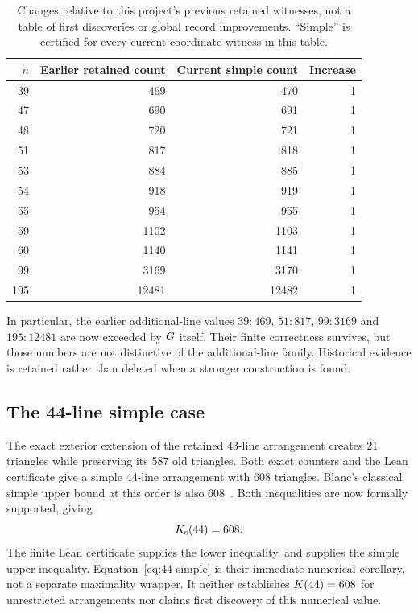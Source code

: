 \begin{table}[tbp]
\centering
\begin{tabular}{@{}rrrr@{}}
\toprule
$n$ & Earlier retained count & Current simple count & Increase\\
\midrule
39&469&470&1\\
47&690&691&1\\
48&720&721&1\\
51&817&818&1\\
53&884&885&1\\
54&918&919&1\\
55&954&955&1\\
59&1102&1103&1\\
60&1140&1141&1\\
99&3169&3170&1\\
195&12481&12482&1\\
\bottomrule
\end{tabular}
\caption{Changes relative to this project's previous retained witnesses, not a table of first discoveries or global record improvements. ``Simple'' is certified for every current coordinate witness in this table.}\label{tab:finite-refinement}
\end{table}

In particular, the earlier additional-line values $39:469$, $51:817$, $99:3169$ and $195:12481$ are now exceeded by $G$ itself. Their finite correctness survives, but those numbers are not distinctive of the additional-line family. Historical evidence is retained rather than deleted when a stronger construction is found.

\subsection{The 44-line simple case}

The exact exterior extension of the retained 43-line arrangement creates 21 triangles while preserving its 587 old triangles. Both exact counters and the Lean certificate give a simple 44-line arrangement with 608 triangles. Blanc's classical simple upper bound at this order is also 608~\cite{blanc2011}. Both inequalities are now formally supported, giving
\begin{equation}\label{eq:44-simple}
K_{\mathrm{s}}(44)=608.
\end{equation}
The finite Lean certificate supplies the lower inequality, and
supplies the simple upper inequality. Equation~\eqref{eq:44-simple} is
their immediate numerical corollary, not a separate maximality wrapper.
It neither establishes $K(44)=608$ for unrestricted arrangements nor
claims first discovery of this numerical value.

